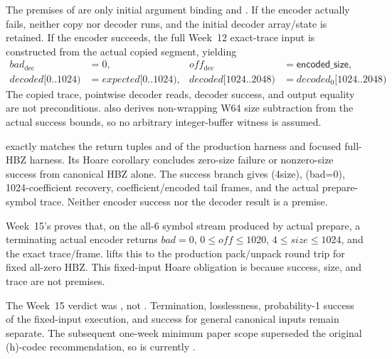 The premises of  are only
initial argument binding and . If the encoder
actually fails, neither copy nor decoder runs, and the initial decoder array/state
is retained. If the encoder succeeds, the full Week~12 exact-trace input is
constructed from the actual copied segment, yielding
\[
\begin{aligned}
  bad_{\mathrm{dec}}&=0,&
  off_{\mathrm{dec}}&=\mathsf{encoded\_size},\\
  decoded[0..1024)&=expected[0..1024),&
  decoded[1024..2048)&=decoded_0[1024..2048)
\end{aligned}
\]
The copied trace, pointwise decoder reads, decoder success, and output equality
are not preconditions.  also derives
non-wrapping W64 size subtraction from the actual success bounds, so no arbitrary
integer-buffer witness is assumed.

 exactly matches the
return tuples and  of the production harness and focused
full-HBZ harness. Its Hoare corollary
 concludes zero-size
failure or nonzero-size success from canonical HBZ alone. The success branch gives
(4\le size), (bad=0), 1024-coefficient recovery, coefficient/encoded tail
frames, and the actual prepare-symbol trace. Neither encoder success nor the
decoder result is a premise.

\begin{verified}
Week~15's  proves that, on the
all-6 symbol stream produced by actual prepare, a terminating actual encoder
returns \(bad=0\), \(0\le off\le1020\), \(4\le size\le1024\), and the exact
trace/frame.  lifts this
to the production pack/unpack round trip for fixed all-zero HBZ. This fixed-input
Hoare obligation is \statusproved{} because success, size, and trace are not premises.
\end{verified}

The Week~15 verdict was , not
. Termination, losslessness, probability-1 success
of the fixed-input execution, and success for general canonical inputs remain
separate. The subsequent one-week minimum paper scope superseded the original
(h)-codec recommendation, so  is currently
\statusdeferred.

